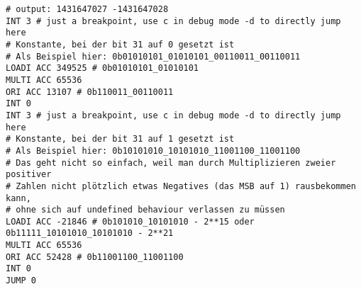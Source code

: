 \documentclass{article}
\begin{document}
%
\begin{verbatim}
# output: 1431647027 -1431647028
INT 3 # just a breakpoint, use c in debug mode -d to directly jump here
# Konstante, bei der bit 31 auf 0 gesetzt ist
# Als Beispiel hier: 0b01010101_01010101_00110011_00110011
LOADI ACC 349525 # 0b01010101_01010101
MULTI ACC 65536
ORI ACC 13107 # 0b110011_00110011
INT 0
INT 3 # just a breakpoint, use c in debug mode -d to directly jump here
# Konstante, bei der bit 31 auf 1 gesetzt ist
# Als Beispiel hier: 0b10101010_10101010_11001100_11001100
# Das geht nicht so einfach, weil man durch Multiplizieren zweier positiver
# Zahlen nicht plötzlich etwas Negatives (das MSB auf 1) rausbekommen kann,
# ohne sich auf undefined behaviour verlassen zu müssen
LOADI ACC -21846 # 0b101010_10101010 - 2**15 oder 0b11111_10101010_10101010 - 2**21
MULTI ACC 65536
ORI ACC 52428 # 0b11001100_11001100
INT 0
JUMP 0
\end{verbatim}
\end{document}
